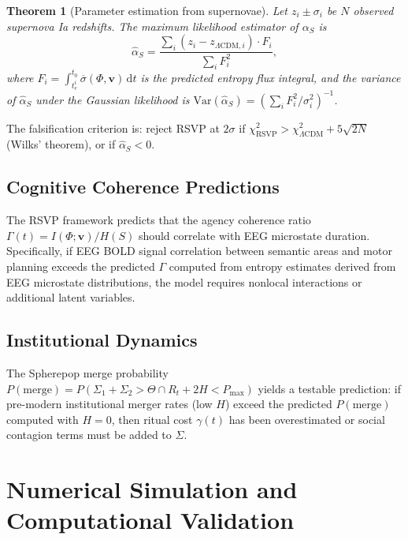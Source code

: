 \documentclass[12pt, a4paper]{article}
\theoremstyle{plain}
\newtheorem{theorem}{Theorem}[section]
\theoremstyle{definition}
\theoremstyle{remark}
\newcommand{\vfield}{\mathbf{v}}
\begin{document}
\begin{theorem}[Parameter estimation from supernovae]
Let $z_i \pm \sigma_i$ be $N$ observed supernova Ia redshifts.  The maximum likelihood
estimator of $\alpha_S$ is
\[
\hat{\alpha}_S = \frac{\sum_i(z_i - z_{\Lambda\mathrm{CDM},i})\cdot F_i}{\sum_i F_i^2},
\]
where $F_i = \int_{t_e^i}^{t_0}\overline{\sigma}(\Phi,\vfield)\,\mathrm{d}t$ is the predicted
entropy flux integral, and the variance of $\hat{\alpha}_S$ under the Gaussian likelihood is
$\mathrm{Var}(\hat{\alpha}_S) = (\sum_i F_i^2/\sigma_i^2)^{-1}$.
\end{theorem}

The falsification criterion is: reject RSVP at $2\sigma$ if $\chi^2_{\mathrm{RSVP}} > \chi^2_{\Lambda\mathrm{CDM}} + 5\sqrt{2N}$ (Wilks' theorem), or if $\hat{\alpha}_S < 0$.

\subsection{Cognitive Coherence Predictions}

The RSVP framework predicts that the agency coherence ratio $\Gamma(t) = I(\Phi;\vfield)/H(S)$
should correlate with EEG microstate duration.  Specifically, if EEG BOLD signal correlation
between semantic areas and motor planning exceeds the predicted $\Gamma$ computed from
entropy estimates derived from EEG microstate distributions, the model requires nonlocal
interactions or additional latent variables.

\subsection{Institutional Dynamics}

The Spherepop merge probability $P(\mathrm{merge}) = P(\Sigma_1 + \Sigma_2 > \Theta \cap R_t + 2H < P_{\max})$
yields a testable prediction: if pre-modern institutional merger rates (low $H$) exceed the
predicted $P(\mathrm{merge})$ computed with $H = 0$, then ritual cost $\gamma(t)$ has been
overestimated or social contagion terms must be added to $\Sigma$.

\section{Numerical Simulation and Computational Validation}
\label{sec:numerics}
\end{document}
